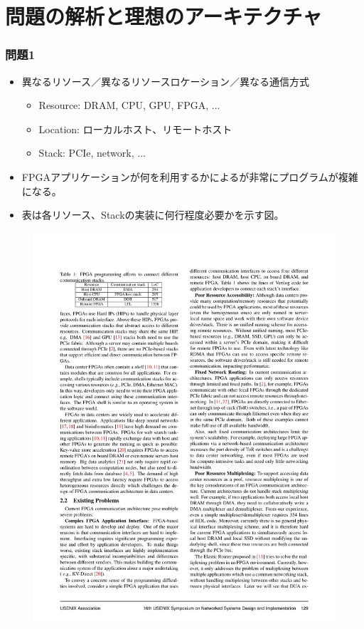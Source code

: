 \documentclass[dvipdfmx,9pt,notheorems]{beamer}
\theoremstyle{definition}
\begin{document}
\section{問題の解析と理想のアーキテクチャ}
\begin{frame}\frametitle{問題1}
	\begin{itemize}
		\item 異なるリソース／異なるリソースロケーション／異なる通信方式
			\begin{itemize}
				\item Resource: DRAM, CPU, GPU,  FPGA, ...
				\item Location: ローカルホスト、リモートホスト
				\item Stack: PCIe, network, ...
			\end{itemize}
		\item FPGAアプリケーションが何を利用するかによるが非常にプログラムが複雑になる。
		\item 表は各リソース、Stackの実装に何行程度必要かを示す図。
	\end{itemize}
  \begin{figure}[htb]
		\includegraphics[scale=1.0]{fig/table1.pdf}
  \end{figure}
	\pnote{
	}
\end{frame}
\end{document}
